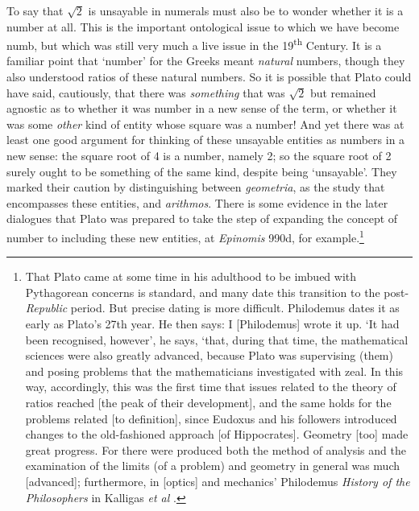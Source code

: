 \documentclass[11pt,oneside,a4paper]{article}
\newcommand*{\sqrtwo}{\ensuremath{\sqrt{2}}\hspace{0.5ex}\xspace}
\begin{document}
To say that \sqrtwo is unsayable in numerals must also be to wonder whether it is a number at all. This is the important ontological issue to which we have become numb, but which was still very much a live issue in the 19\textsuperscript{th} Century. It is a familiar point that `number' for the Greeks meant \textit{natural} numbers, though they also understood ratios of these natural numbers. So it is possible that Plato could have said, cautiously, that there was \textit{something} that was \sqrtwo but remained agnostic as to whether it was number in a new sense of the term, or whether it was some \textit{other} kind of entity whose square was a number! And yet there was at least one good argument for thinking of these unsayable entities as numbers in a new sense: the square root of 4 is a number, namely 2; so the square root of 2 surely ought to be something of the same kind, despite being `unsayable'. They marked their caution by distinguishing between \textit{geometria}, as the study that encompasses these entities, and \textit{arithmos}. There is some evidence in the later dialogues that Plato was prepared to take the step of expanding the concept of number to including these new entities, at  \textit{Epinomis} 990d, for example.\footnote{That Plato came at some time in his adulthood to be imbued with Pythagorean concerns is standard, and many date this transition to the post-\textit{Republic} period. But precise dating is more difficult. Philodemus dates it as early as Plato's 27th year. He then says: I [Philodemus] wrote it up. ‘It had been recognised, however’, he says, ‘that, during that time, the mathematical sciences were also greatly advanced, because Plato was supervising (them) and posing problems that the mathematicians investigated with zeal. In this way, accordingly, this was the first time that issues related to the theory of ratios reached [the peak of their development], and the same holds for the problems related [to definition], since Eudoxus and his followers introduced changes to the old-fashioned approach [of Hippocrates]. Geometry [too] made great progress. For there were produced both the method of analysis and the examination of the limits (of a problem) and geometry in general was much [advanced]; furthermore, in [optics] and mechanics\xelip' Philodemus \textit{History of the Philosophers} in Kalligas \emph{et al} \parencite*{kalligas_platos_2020}.}
\end{document}

